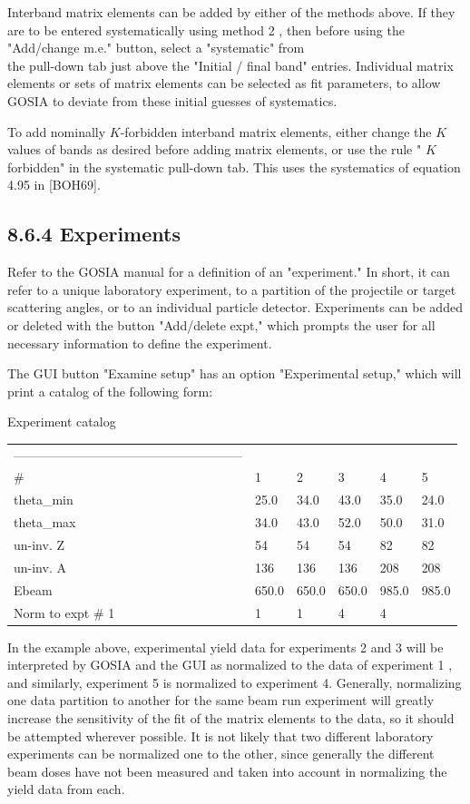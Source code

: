 \documentclass[10pt]{article}
\begin{document}
Interband matrix elements can be added by either of the methods above. If they are to be entered systematically using method 2 , then before using the "Add/change m.e." button, select a "systematic" from\\
the pull-down tab just above the "Initial / final band" entries. Individual matrix elements or sets of matrix elements can be selected as fit parameters, to allow GOSIA to deviate from these initial guesses of systematics.

To add nominally $K$-forbidden interband matrix elements, either change the $K$ values of bands as desired before adding matrix elements, or use the rule " $K$ forbidden" in the systematic pull-down tab. This uses the systematics of equation 4.95 in [BOH69].

\subsection*{8.6.4 Experiments}
Refer to the GOSIA manual for a definition of an "experiment." In short, it can refer to a unique laboratory experiment, to a partition of the projectile or target scattering angles, or to an individual particle detector. Experiments can be added or deleted with the button "Add/delete expt," which prompts the user for all necessary information to define the experiment.

The GUI button "Examine setup" has an option "Experimental setup," which will print a catalog of the following form:

Experiment catalog

\begin{center}
\begin{tabular}{llllll}
------------------------------------------------------ &  &  &  &  &  \\
\# & 1 & 2 & 3 & 4 & 5 \\
theta\_min & 25.0 & 34.0 & 43.0 & 35.0 & 24.0 \\
theta\_max & 34.0 & 43.0 & 52.0 & 50.0 & 31.0 \\
un-inv. Z & 54 & 54 & 54 & 82 & 82 \\
un-inv. A & 136 & 136 & 136 & 208 & 208 \\
Ebeam & 650.0 & 650.0 & 650.0 & 985.0 & 985.0 \\
Norm to expt \# 1 & 1 & 1 & 4 & 4 &  \\
\end{tabular}
\end{center}

In the example above, experimental yield data for experiments 2 and 3 will be interpreted by GOSIA and the GUI as normalized to the data of experiment 1 , and similarly, experiment 5 is normalized to experiment 4. Generally, normalizing one data partition to another for the same beam run experiment will greatly increase the sensitivity of the fit of the matrix elements to the data, so it should be attempted wherever possible. It is not likely that two different laboratory experiments can be normalized one to the other, since generally the different beam doses have not been measured and taken into account in normalizing the yield data from each.
\end{document}
